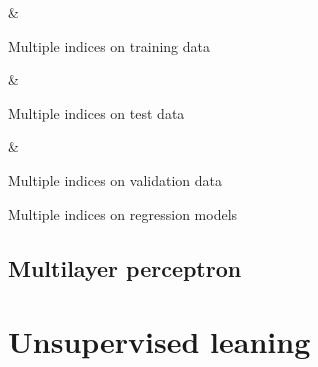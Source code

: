 \documentclass[journal]{IEEEtran}
\begin{document}
\begin{table}
    \hfill
    \begin{subtable}{0.45\linewidth}
        {\csvcoli & \csvcolii}%
        \caption{Multiple indices on training data\label{tab:regression:index:train}}
    \end{subtable}
    \hfill%
    \begin{subtable}{0.45\linewidth}
        {\csvcoli & \csvcolii}%
        \caption{Multiple indices on test data\label{tab:regression:index:test}}
    \end{subtable}
    \hfill

    \begin{subtable}{\linewidth}
        {\csvcoli & \csvcolii}%
        \caption{Multiple indices on validation data\label{tab:regression:index:validation}}
    \end{subtable}
    \caption{Multiple indices on regression models\label{tab:regression:index}}
\end{table}

\subsection{Multilayer perceptron\label{sec:nn}}

\section{Unsupervised leaning\label{sec:unsupervised}}
\printbibliography
\end{document}
